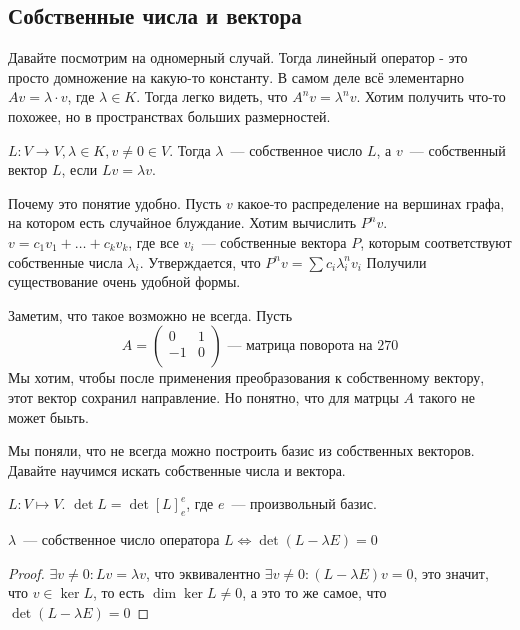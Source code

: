 \subsection{Собственные числа и вектора}
\begin{motivation}
    Давайте посмотрим на одномерный случай. Тогда линейный оператор - это просто домножение на какую-то константу. В самом деле всё элементарно $Av = \lambda\cdot v$, где $\lambda\in K$.
    Тогда легко видеть, что $A^nv = \lambda^n v$. Хотим получить что-то похожее, но в пространствах больших размерностей.
\end{motivation}
\begin{definition}
    $L\colon V\rightarrow V, \lambda\in K, v\not= 0\in V$. Тогда $\lambda$~--- собственное число $L$, а $v$~--- собственный вектор $L$,
    если $Lv = \lambda v$.
\end{definition}
\begin{motivation}
    Почему это понятие удобно. Пусть $v$ какое-то распределение на вершинах графа, на котором есть случайное блуждание.
    Хотим вычислить $P^n v$. $v = c_1v_1 + \dots + c_kv_k$, где все $v_i$~--- собственные вектора $P$, которым соответствуют собственные числа $\lambda_i$. Утверждается, что $P^n v = \sum c_i \lambda_i^n v_i$
    Получили существование очень удобной формы.
\end{motivation}
\begin{remark}
    Заметим, что такое возможно не всегда.
    Пусть 
     \[
    A = 
    \begin{pmatrix}
        0& 1\\
        -1&0\\
    \end{pmatrix}
    \text{~--- матрица поворота на 270}\]
    Мы хотим, чтобы после применения преобразования к собственному вектору, этот вектор сохранил направление. Но понятно, что для матрцы $A$ такого не может быьть.
\end{remark}
\begin{motivation}
    Мы поняли, что не всегда можно построить базис из собственных векторов. \\
    Давайте научимся искать собственные числа и вектора.
\end{motivation}
\begin{definition}
    $L\colon V\mapsto V$. $\det L = \det[L]^e_e$, где $e$~--- произвольный базис.
\end{definition}
\begin{statement}
    $\lambda$~--- собственное число оператора $L \Leftrightarrow \det(L - \lambda E) = 0$
\end{statement}
\begin{proof}
    $\exists v\not= 0\colon Lv = \lambda v$, что эквивалентно $\exists v\not=0\colon (L - \lambda E)v = 0$, это значит, что $v \in \ker L$, то есть $\dim \ker L \neq 0$, а это то же самое, что $\det(L - \lambda E) = 0$
\end{proof}
